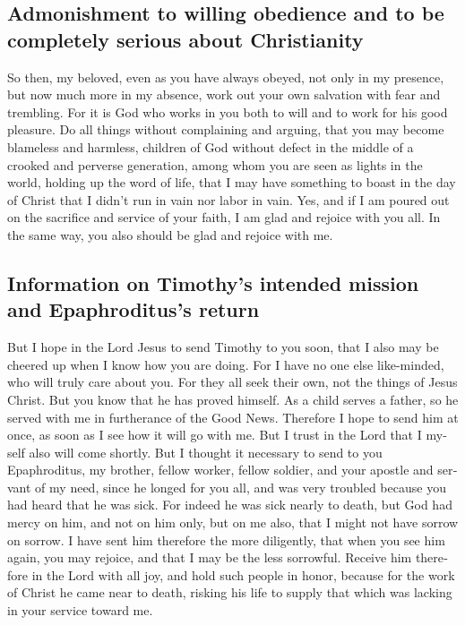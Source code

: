 \begin{paracol}{2}
\begin{otherlanguage}{english}
\hypertarget{admonishment-to-willing-obedience-and-to-be-completely-serious-about-christianity}{%
\subsection{Admonishment to willing obedience and to be completely
serious about
Christianity}\label{admonishment-to-willing-obedience-and-to-be-completely-serious-about-christianity}}

 So then, my beloved, even as you have always obeyed, not
only in my presence, but now much more in my absence, work out your own
salvation with fear and trembling.  For it is God who
works in you both to will and to work for his good pleasure.
 Do all things without complaining and arguing,
 that you may become blameless and harmless, children of
God without defect in the middle of a crooked and perverse generation,
among whom you are seen as lights in the world,  holding
up the word of life, that I may have something to boast in the day of
Christ that I didn't run in vain nor labor in vain.  Yes,
and if I am poured out on the sacrifice and service of your faith, I am
glad and rejoice with you all.  In the same way, you also
should be glad and rejoice with me.

\hypertarget{information-on-timothys-intended-mission-and-epaphrodituss-return}{%
\subsection{Information on Timothy's intended mission and Epaphroditus's
return}\label{information-on-timothys-intended-mission-and-epaphrodituss-return}}

 But I hope in the Lord Jesus to send Timothy to you
soon, that I also may be cheered up when I know how you are doing.
 For I have no one else like-minded, who will truly care
about you.  For they all seek their own, not the things
of Jesus Christ.  But you know that he has proved
himself. As a child serves a father, so he served with me in furtherance
of the Good News.  Therefore I hope to send him at once,
as soon as I see how it will go with me.  But I trust in
the Lord that I myself also will come shortly.  But I
thought it necessary to send to you Epaphroditus, my brother, fellow
worker, fellow soldier, and your apostle and servant of my need,
 since he longed for you all, and was very troubled
because you had heard that he was sick.  For indeed he
was sick nearly to death, but God had mercy on him, and not on him only,
but on me also, that I might not have sorrow on sorrow. 
I have sent him therefore the more diligently, that when you see him
again, you may rejoice, and that I may be the less sorrowful.
 Receive him therefore in the Lord with all joy, and hold
such people in honor,  because for the work of Christ he
came near to death, risking his life to supply that which was lacking in
your service toward me.


\end{otherlanguage}
\end{paracol}
